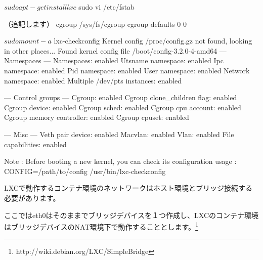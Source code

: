 \documentclass[mingoth,a4paper]{jsarticle}
\begin{document}
\begin{commandline}
$ sudo apt-get install lxc
$ sudo vi /etc/fstab

（追記します）
cgroup  /sys/fs/cgroup  cgroup  defaults  0   0

$ sudo mount -a
$ lxc-checkconfig
Kernel config /proc/config.gz not found, looking in other places...
Found kernel config file /boot/config-3.2.0-4-amd64
--- Namespaces ---
Namespaces: enabled
Utsname namespace: enabled
Ipc namespace: enabled
Pid namespace: enabled
User namespace: enabled
Network namespace: enabled
Multiple /dev/pts instances: enabled

--- Control groups ---
Cgroup: enabled
Cgroup clone_children flag: enabled
Cgroup device: enabled
Cgroup sched: enabled
Cgroup cpu account: enabled
Cgroup memory controller: enabled
Cgroup cpuset: enabled

--- Misc ---
Veth pair device: enabled
Macvlan: enabled
Vlan: enabled
File capabilities: enabled

Note : Before booting a new kernel, you can check its configuration
usage : CONFIG=/path/to/config /usr/bin/lxc-checkconfig
\end{commandline}

LXCで動作するコンテナ環境のネットワークはホスト環境とブリッジ接続する必要があります。

ここではeth0はそのままでブリッジデバイスを１つ作成し、LXCのコンテナ環境はブリッジデバイスのNAT環境下で動作することとします。\footnote{http://wiki.debian.org/LXC/SimpleBridge}
\end{document}
